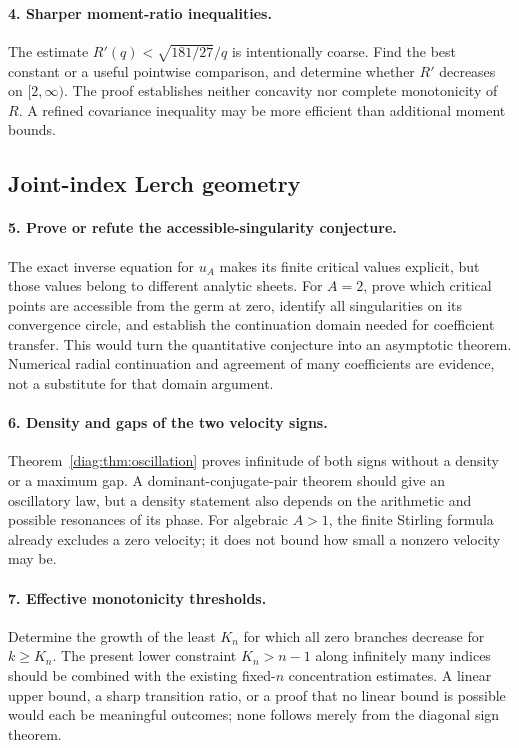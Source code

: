 \documentclass[11pt,a4paper]{article}
\theoremstyle{definition}
\theoremstyle{remark}
\numberwithin{equation}{section}
\begin{document}
\paragraph{4. Sharper moment-ratio inequalities.}
The estimate $R'(q)<\sqrt{181/27}/q$ is intentionally coarse.
Find the best constant or a useful pointwise comparison, and determine
whether $R'$ decreases on $[2,\infty)$. The proof establishes neither
concavity nor complete monotonicity of $R$. A refined covariance
inequality may be more efficient than additional moment bounds.

\subsection{Joint-index Lerch geometry}

\paragraph{5. Prove or refute the accessible-singularity conjecture.}
The exact inverse equation for $u_A$ makes its finite critical values
explicit, but those values belong to different analytic sheets.
For $A=2$, prove which critical points are accessible from the germ
at zero, identify all singularities on its convergence circle, and
establish the continuation domain needed for coefficient transfer.
This would turn the quantitative conjecture into an asymptotic theorem.
Numerical radial continuation and agreement of many coefficients
are evidence, not a substitute for that domain argument.

\paragraph{6. Density and gaps of the two velocity signs.}
Theorem~\ref{diag:thm:oscillation} proves infinitude of both signs without
a density or a maximum gap. A dominant-conjugate-pair theorem should
give an oscillatory law, but a density statement also depends on the
arithmetic and possible resonances of its phase. For algebraic
$A>1$, the finite Stirling formula already excludes a zero velocity;
it does not bound how small a nonzero velocity may be.

\paragraph{7. Effective monotonicity thresholds.}
Determine the growth of the least $K_n$ for which all zero branches
decrease for $k\ge K_n$. The present lower constraint
$K_n>n-1$ along infinitely many indices should be combined with the
existing fixed-$n$ concentration estimates. A linear upper bound,
a sharp transition ratio, or a proof that no linear bound is possible
would each be meaningful outcomes; none follows merely from the
diagonal sign theorem.
\end{document}
